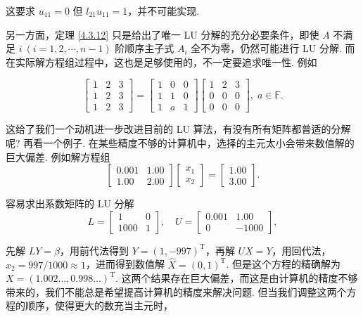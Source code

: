 \documentclass[10pt,openany]{article}
\theoremstyle{thmstyle} %
\theoremstyle{defstyle} %
\theoremstyle{prostyle} %
\theoremstyle{exastyle}
\theoremstyle{remstyle}
\newcommand{\T}{^{\text{T}}}
\newcommand{\F}{\mathbb{F}}
\begin{document}
这要求 \( u_{11}=0 \) 但 \( l_{21}u_{11}=1 \)，并不可能实现.

另一方面，定理 \ref{4.3.12} 只是给出了唯一 LU 分解的充分必要条件，即使 \( A \) 不满足  \( i \ (i=1,2,\cdots,n-1) \) 阶顺序主子式 \( A_i \) 全不为零，仍然可能进行 LU 分解. 而在实际解方程组过程中，这也是足够使用的，不一定要追求唯一性. 例如

\[ \begin{bmatrix}
	1 & 2 & 3 \\
	1 & 2 & 3 \\
	1 & 2 & 3
\end{bmatrix}=\begin{bmatrix}
1 & 0 & 0 \\
1 & 1 & 0 \\
1 & a & 1
\end{bmatrix}\begin{bmatrix}
 1 & 2 & 3 \\
 0 & 0 & 0 \\
 0 & 0 & 0
\end{bmatrix}, \; a \in \F. \]

这给了我们一个动机进一步改进目前的 LU 算法，有没有所有矩阵都普适的分解呢? 再看一个例子. 在某些精度不够的计算机中，选择的主元太小会带来数值解的巨大偏差. 例如解方程组
\[
\begin{bmatrix}
	0.001 & 1.00 \\
	1.00 & 2.00
\end{bmatrix}
\begin{bmatrix}
	x_1 \\
	x_2
\end{bmatrix}
=
\begin{bmatrix}
	1.00 \\
	3.00
\end{bmatrix}.
\]

容易求出系数矩阵的 LU 分解
\[
L =
\begin{bmatrix}
	1 & 0 \\
	1000 & 1
\end{bmatrix}, \quad
U =
\begin{bmatrix}
	0.001 & 1.00 \\
	0 & -1000
\end{bmatrix},
\]

先解 \( LY=\beta \)，用前代法得到 \( Y=(1,-997)\T \)，再解 \( UX=Y \)，用回代法， \( x_2=997/1000 \approx 1 \)，进而得到数值解 \( \hat{X} = (0, 1)\T \). 但是这个方程的精确解为 \( X = (1.002\ldots, 0.998\ldots)\T \). 这两个结果存在巨大偏差，而这是由计算机的精度不够带来的，我们不能总是希望提高计算机的精度来解决问题. 但当我们调整这两个方程的顺序，使得更大的数充当主元时，
\end{document}
